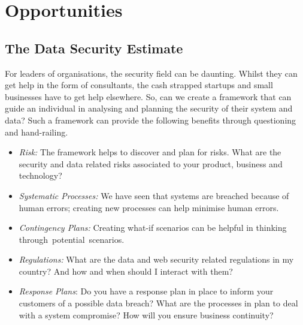 

\section{Opportunities}
\label{sec::chp3::opportunities}


\subsection{The Data Security Estimate}

For leaders of organisations, the security field can be daunting. Whilst they can get help in the form of consultants, the cash strapped startups and small businesses have to get help elsewhere. So, can we create a framework that can guide an individual in analysing and planning the security of their system and data? Such a framework can provide the following benefits through questioning and hand-railing.

\begin{itemize}
\item
  \emph{Risk:} The framework helps to discover and plan for risks. What
  are the security and data related risks associated to your product,
  business and technology?
\item
  \emph{Systematic Processes:} We have seen that systems are breached
  because of human errors; creating new processes can help minimise
  human errors.
\item
  \emph{Contingency Plans:} Creating what-if scenarios can be helpful in
  thinking through~potential~scenarios.
\item
  \emph{Regulations:} What are the data and web security related
  regulations in my country? And how and when should I interact with
  them?
\item
  \emph{Response Plans}: Do you have a response plan in place to inform
  your customers of a possible data breach? What are the processes in
  plan to deal with a system compromise? How will you ensure business
  continuity?
\end{itemize}

